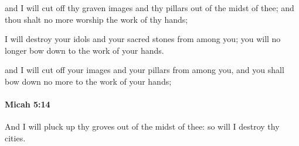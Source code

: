 			\begin{versebox}
					\item[BHS] 
					\item[LXX] 
					\item[ASV] and I will cut off thy graven images and thy pillars out of the midst of thee; and thou shalt no more worship the work of thy hands;
					\item[NIV] I will destroy your idols and your sacred stones from among you; you will no longer bow down to the work of your hands.
					\item[NRSV] and I will cut off your images and your pillars from among you, and you shall bow down no more to the work of your hands;
			\end{versebox}

		\paragraph{Micah 5:14} %
			\label{MICAH-5-14}

			And I will pluck up thy groves out of the midst of thee: so will I destroy thy cities.

